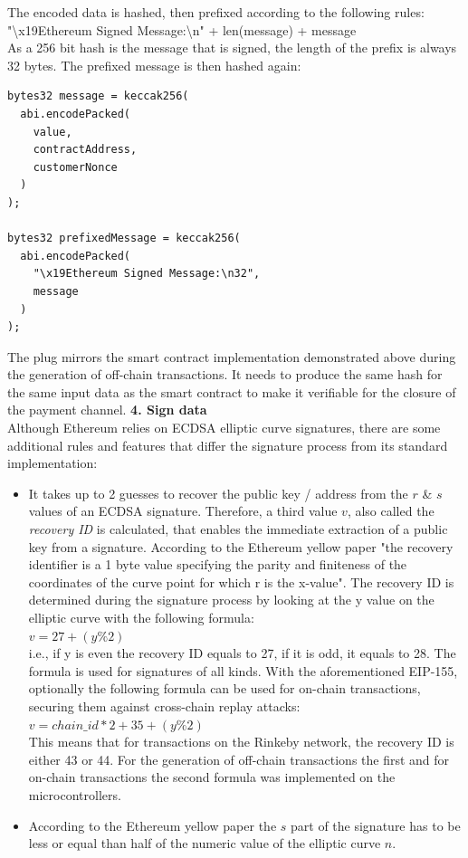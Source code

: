 The encoded data is hashed, then prefixed according to the following rules:
\\
"\textbackslash x19Ethereum Signed Message:\textbackslash n" + len(message) + message
\\
As a 256 bit hash is the message that is signed, the length of the prefix is always 32 bytes.
The prefixed message is then hashed again:
\\
\begin{lstlisting}[language=Solidity, numbers=none]
bytes32 message = keccak256(
  abi.encodePacked(
    value,
    contractAddress,
    customerNonce
  )
);

bytes32 prefixedMessage = keccak256(
  abi.encodePacked(
    "\x19Ethereum Signed Message:\n32",
    message
  )
);
\end{lstlisting}
The plug mirrors the smart contract implementation demonstrated above during the generation of off-chain transactions.
It needs to produce the same hash for the same input data as the smart contract to make it verifiable for the closure of the payment channel.
\newpage
\textbf{4. Sign data}\\
Although Ethereum relies on ECDSA elliptic curve signatures, there are some additional rules and features that differ the signature process from its standard implementation:
\begin{itemize}
  \item It takes up to 2 guesses to recover the public key / address from the $r$ \& $s$ values of an ECDSA signature.
  Therefore, a third value $v$, also called the \textit{recovery ID} is calculated, that enables the immediate extraction of a public key from a signature.
  According to the Ethereum yellow paper\cite{ethereum-yellow-paper} "the recovery identifier is a 1 byte value specifying the parity and finiteness of the coordinates of the curve point for which r is the x-value".
  The recovery ID is determined during the signature process by looking at the y value on the elliptic curve with the following formula:
  \\
  $v = 27 + (y \% 2)$
  \\
  i.e., if y is even the recovery ID equals to 27, if it is odd, it equals to 28.
  The formula is used for signatures of all kinds.
  With the aforementioned EIP-155, optionally the following formula can be used for on-chain transactions, securing them against cross-chain replay attacks:
  \\
  $v = chain\_id * 2 + 35 + (y \% 2)$
  \\
  This means that for transactions on the Rinkeby network, the recovery ID is either 43 or 44.
  For the generation of off-chain transactions the first and for on-chain transactions the second formula was implemented on the microcontrollers.
  \item According to the Ethereum yellow paper\cite{ethereum-yellow-paper} the $s$ part of the signature has to be less or equal than half of the numeric value of the elliptic curve $n$.
\end{itemize}
